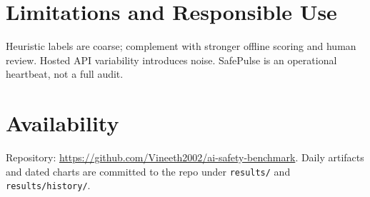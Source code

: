 \documentclass[11pt]{article}
\begin{document}
\section{Limitations and Responsible Use}
Heuristic labels are coarse; complement with stronger offline scoring and human review. Hosted API variability introduces noise. SafePulse is an operational heartbeat, not a full audit.

\section{Availability}
Repository: \url{https://github.com/Vineeth2002/ai-safety-benchmark}. Daily artifacts and dated charts are committed to the repo under \texttt{results/} and \texttt{results/history/}.
\end{document}
